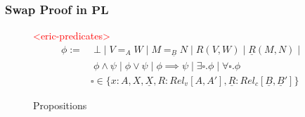 \documentclass[acmsmall]{acmart}
\newcommand{\eric}[1]{\textcolor{red}{ <eric-#1> }}
\newcommand{\pl}{$\mathbf{PL}$}
\begin{document}
\subsubsection{Swap Proof in \pl}


\begin{figure}[h]
  \centering
  \eric{predicates}
  \scriptsize
  \begin{align*}
    \phi :=&\; \bot\;|\;V=_{A}W \;|\; M=_{\underline{B}}N \;|\; R(V,W) \;|\; \underline{R}(M,N) \;|\; 
    \\
    &\; \phi \land \psi \;|\; \phi \lor \psi \;|\; \phi \implies \psi \;|\; \exists \square.\phi \;|\; \forall \square .\phi \\ 
    & \square \in \{x:A,X,\underline{X},R:Rel_v[A,A'],\underline{R}:Rel_c[\underline{B},\underline{B}']\}
    \end{align*}
  \caption{Propositions}
  \label{fig:Props}
\end{figure}
\end{document}
